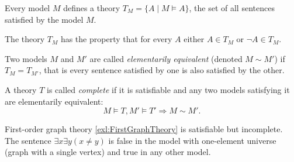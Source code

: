 \begin{page}
\setcounter{section}{3}
\setcounter{subsection}{1}
\setcounter{dfn}{5}
\label{portion:590}

\begin{exl}
Every model $M$ defines a theory $T_M = \{A \mid M \vDash A\}$, the set of all sentences satisfied by the model $M$.
\end{exl}

\end{page}

\begin{page}
\setcounter{section}{3}
\setcounter{subsection}{1}
\setcounter{dfn}{5}
\label{portion:591}

The theory $T_M$ has the property that for every $A$ either $A \in T_M$ or $\neg A \in T_M$.



\end{page}

\begin{page}
\setcounter{section}{3}
\setcounter{subsection}{1}
\setcounter{dfn}{6}
\label{portion:593}

\begin{dfn}
Two models $M$ and $M'$ are called \emph{elementarily equivalent} (denoted $M \sim M'$) if $T_M = T_{M'}$, that is
every sentence satisfied by one is also satisfied by the other.
\end{dfn}

\end{page}

\begin{page}
\setcounter{section}{3}
\setcounter{subsection}{1}
\setcounter{dfn}{7}
\label{portion:596}

\begin{dfn}
A theory $T$ is called \emph{complete} if it is satisfiable and any two models satisfying it are elementarily equivalent:
\[
M \vDash T, M' \vDash T' \Rightarrow M \sim M'.
\]
\end{dfn}

\end{page}

\begin{page}
\setcounter{section}{3}
\setcounter{subsection}{1}
\setcounter{dfn}{8}
\label{portion:599}

\begin{exl}
First-order graph theory \ref{exl:FirstGraphTheory} is satisfiable but incomplete.
The sentence $\exists x \exists y (x \ne y)$ is false in the model with one-element universe (graph with a single vertex) and true in any other model.
\end{exl}

\end{page}

